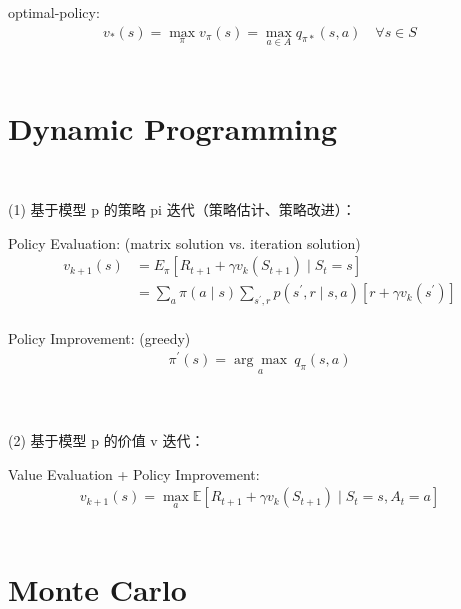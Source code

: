\documentclass{article}
\begin{document}
optimal-policy: 
\begin{align*}
    v_{*}(s) = \max_{\pi} v_{\pi}(s)
    = \max_{a \in A} q_{\pi *}(s, a) 
    \quad \forall s \in S
\end{align*}
\\[6pt]


\newpage
\section{Dynamic Programming}


~ \\[6pt]
\begin{CJK}{UTF8}{gbsn}
    (1) 基于模型 p 的策略 pi 迭代（策略估计、策略改进）： \\[6pt]
\end{CJK}


Policy Evaluation: (matrix solution vs. iteration solution)
\begin{align*}
    v_{k+1}(s) 
    &= {E}_{\pi} \left[ R_{t+1}+\gamma 
    v_{k} \left( S_{t+1} \right) \mid S_{t}=s \right] \\
    &= \sum_{a} \pi(a \mid s) \sum_{s^{\prime}, r} 
    p \left( s^{\prime}, r \mid s, a \right) 
    \left[ r+\gamma v_{k} \left( s^{\prime} \right) \right]
\end{align*}
\\[6pt]


Policy Improvement: (greedy)
\begin{align*}
    \pi^{\prime}(s) = \underset{a}{\arg \max} \ q_{\pi}(s, a)
\end{align*}
\\[6pt]


~ \\[6pt]
\begin{CJK}{UTF8}{gbsn}
    (2) 基于模型 p 的价值 v 迭代： \\[6pt]
\end{CJK}


Value Evaluation + Policy Improvement: 
\begin{align*}
    v_{k+1}(s) = \max_{a} 
    \mathbb{E} \left[ R_{t+1}+\gamma 
    v_{k} \left( S_{t+1} \right) \mid S_{t}=s, A_{t}=a \right]
\end{align*}
\\[6pt]


\section{Monte Carlo}
\end{document}
